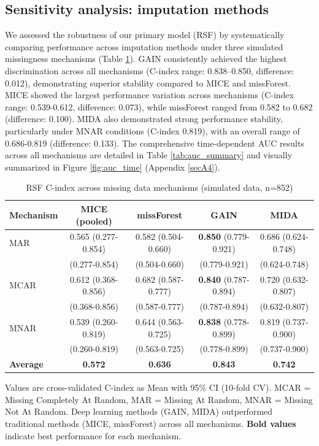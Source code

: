 \documentclass[pdflatex,sn-mathphys-num]{sn-jnl}%
\theoremstyle{thmstyleone}%
\theoremstyle{thmstyletwo}%
\theoremstyle{thmstylethree}%
\begin{document}
\subsection{Sensitivity analysis: imputation methods}
We assessed the robustness of our primary model (RSF) by systematically comparing performance across imputation methods under three simulated missingness mechanisms (Table \ref{tab:imputation_comparison}). GAIN consistently achieved the highest discrimination across all mechanisms (C-index range: 0.838--0.850, difference: 0.012), demonstrating superior stability compared to MICE and missForest. MICE showed the largest performance variation across mechanisms (C-index range: 0.539-0.612, difference: 0.073), while missForest ranged from 0.582 to 0.682 (difference: 0.100). MIDA also demonstrated strong performance stability, particularly under MNAR conditions (C-index 0.819), with an overall range of 0.686-0.819 (difference: 0.133). The comprehensive time-dependent AUC results across all mechanisms are detailed in Table \ref{tab:auc_summary} and visually summarized in Figure \ref{fig:auc_time} (Appendix \ref{secA4}).

\begin{table}[!ht]
\centering
\begin{minipage}{\textwidth}
\caption{RSF C-index across missing data mechanisms (simulated data, n=852)}
\label{tab:imputation_comparison}
\begin{tabular}{@{}lcccc@{}}
\toprule
\textbf{Mechanism} & \textbf{MICE (pooled)} & \textbf{missForest} & \textbf{GAIN} & \textbf{MIDA} \\
\midrule
MAR & 0.565 (0.277-0.854) & 0.582 (0.504-0.660) & \textbf{0.850} (0.779-0.921) & 0.686 (0.624-0.748) \\
     & \scriptsize (0.277-0.854) & \scriptsize (0.504-0.660) & \scriptsize (0.779-0.921) & \scriptsize (0.624-0.748) \\[0.5ex]
MCAR & 0.612 (0.368-0.856) & 0.682 (0.587-0.777) & \textbf{0.840} (0.787-0.894) & 0.720 (0.632-0.807) \\
     & \scriptsize (0.368-0.856) & \scriptsize (0.587-0.777) & \scriptsize (0.787-0.894) & \scriptsize (0.632-0.807) \\[0.5ex]
MNAR & 0.539 (0.260-0.819) & 0.644 (0.563-0.725) & \textbf{0.838} (0.778-0.899) & 0.819 (0.737-0.900) \\
     & \scriptsize (0.260-0.819) & \scriptsize (0.563-0.725) & \scriptsize (0.778-0.899) & \scriptsize (0.737-0.900) \\[0.5ex]
\midrule
\textbf{Average} & \textbf{0.572} & \textbf{0.636} & \textbf{0.843} & \textbf{0.742} \\
\bottomrule
\end{tabular}
\par\medskip
\tiny
Values are cross-validated C-index as Mean with 95\% CI (10-fold CV). MCAR = Missing Completely At Random, MAR = Missing At Random, MNAR = Missing Not At Random. Deep learning methods (GAIN, MIDA) outperformed traditional methods (MICE, missForest) across all mechanisms. \textbf{Bold values} indicate best performance for each mechanism.
\end{minipage}
\end{table}
\end{document}
